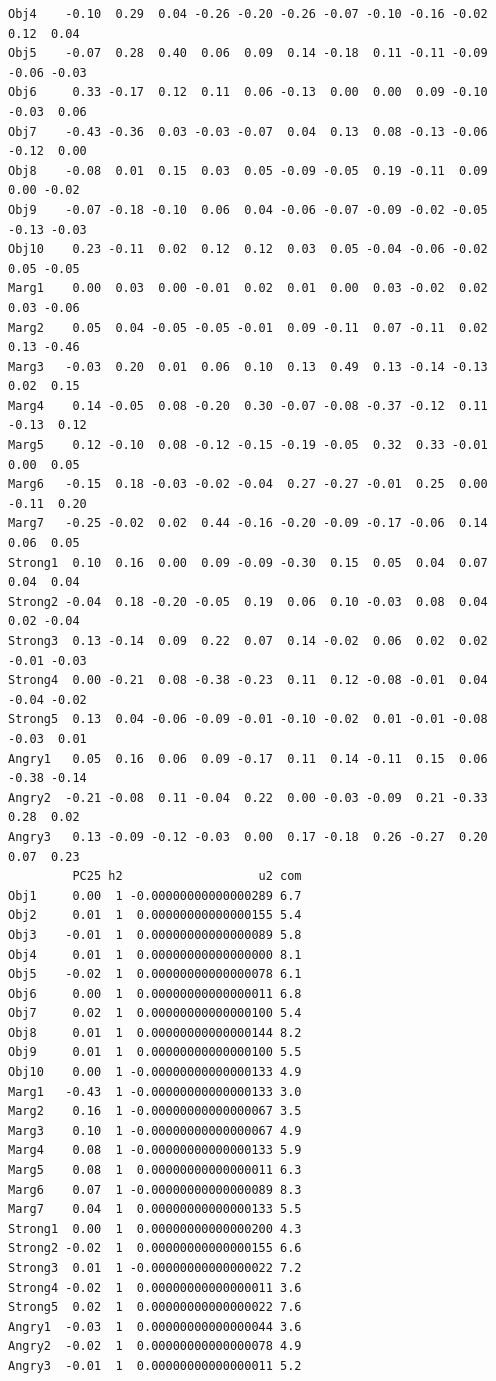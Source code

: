 \documentclass[
  english,
]{book}
\begin{document}
\begin{verbatim}
Obj4    -0.10  0.29  0.04 -0.26 -0.20 -0.26 -0.07 -0.10 -0.16 -0.02  0.12  0.04
Obj5    -0.07  0.28  0.40  0.06  0.09  0.14 -0.18  0.11 -0.11 -0.09 -0.06 -0.03
Obj6     0.33 -0.17  0.12  0.11  0.06 -0.13  0.00  0.00  0.09 -0.10 -0.03  0.06
Obj7    -0.43 -0.36  0.03 -0.03 -0.07  0.04  0.13  0.08 -0.13 -0.06 -0.12  0.00
Obj8    -0.08  0.01  0.15  0.03  0.05 -0.09 -0.05  0.19 -0.11  0.09  0.00 -0.02
Obj9    -0.07 -0.18 -0.10  0.06  0.04 -0.06 -0.07 -0.09 -0.02 -0.05 -0.13 -0.03
Obj10    0.23 -0.11  0.02  0.12  0.12  0.03  0.05 -0.04 -0.06 -0.02  0.05 -0.05
Marg1    0.00  0.03  0.00 -0.01  0.02  0.01  0.00  0.03 -0.02  0.02  0.03 -0.06
Marg2    0.05  0.04 -0.05 -0.05 -0.01  0.09 -0.11  0.07 -0.11  0.02  0.13 -0.46
Marg3   -0.03  0.20  0.01  0.06  0.10  0.13  0.49  0.13 -0.14 -0.13  0.02  0.15
Marg4    0.14 -0.05  0.08 -0.20  0.30 -0.07 -0.08 -0.37 -0.12  0.11 -0.13  0.12
Marg5    0.12 -0.10  0.08 -0.12 -0.15 -0.19 -0.05  0.32  0.33 -0.01  0.00  0.05
Marg6   -0.15  0.18 -0.03 -0.02 -0.04  0.27 -0.27 -0.01  0.25  0.00 -0.11  0.20
Marg7   -0.25 -0.02  0.02  0.44 -0.16 -0.20 -0.09 -0.17 -0.06  0.14  0.06  0.05
Strong1  0.10  0.16  0.00  0.09 -0.09 -0.30  0.15  0.05  0.04  0.07  0.04  0.04
Strong2 -0.04  0.18 -0.20 -0.05  0.19  0.06  0.10 -0.03  0.08  0.04  0.02 -0.04
Strong3  0.13 -0.14  0.09  0.22  0.07  0.14 -0.02  0.06  0.02  0.02 -0.01 -0.03
Strong4  0.00 -0.21  0.08 -0.38 -0.23  0.11  0.12 -0.08 -0.01  0.04 -0.04 -0.02
Strong5  0.13  0.04 -0.06 -0.09 -0.01 -0.10 -0.02  0.01 -0.01 -0.08 -0.03  0.01
Angry1   0.05  0.16  0.06  0.09 -0.17  0.11  0.14 -0.11  0.15  0.06 -0.38 -0.14
Angry2  -0.21 -0.08  0.11 -0.04  0.22  0.00 -0.03 -0.09  0.21 -0.33  0.28  0.02
Angry3   0.13 -0.09 -0.12 -0.03  0.00  0.17 -0.18  0.26 -0.27  0.20  0.07  0.23
         PC25 h2                   u2 com
Obj1     0.00  1 -0.00000000000000289 6.7
Obj2     0.01  1  0.00000000000000155 5.4
Obj3    -0.01  1  0.00000000000000089 5.8
Obj4     0.01  1  0.00000000000000000 8.1
Obj5    -0.02  1  0.00000000000000078 6.1
Obj6     0.00  1  0.00000000000000011 6.8
Obj7     0.02  1  0.00000000000000100 5.4
Obj8     0.01  1  0.00000000000000144 8.2
Obj9     0.01  1  0.00000000000000100 5.5
Obj10    0.00  1 -0.00000000000000133 4.9
Marg1   -0.43  1 -0.00000000000000133 3.0
Marg2    0.16  1 -0.00000000000000067 3.5
Marg3    0.10  1 -0.00000000000000067 4.9
Marg4    0.08  1 -0.00000000000000133 5.9
Marg5    0.08  1  0.00000000000000011 6.3
Marg6    0.07  1 -0.00000000000000089 8.3
Marg7    0.04  1  0.00000000000000133 5.5
Strong1  0.00  1  0.00000000000000200 4.3
Strong2 -0.02  1  0.00000000000000155 6.6
Strong3  0.01  1 -0.00000000000000022 7.2
Strong4 -0.02  1  0.00000000000000011 3.6
Strong5  0.02  1  0.00000000000000022 7.6
Angry1  -0.03  1  0.00000000000000044 3.6
Angry2  -0.02  1  0.00000000000000078 4.9
Angry3  -0.01  1  0.00000000000000011 5.2


\end{verbatim}
\end{document}
